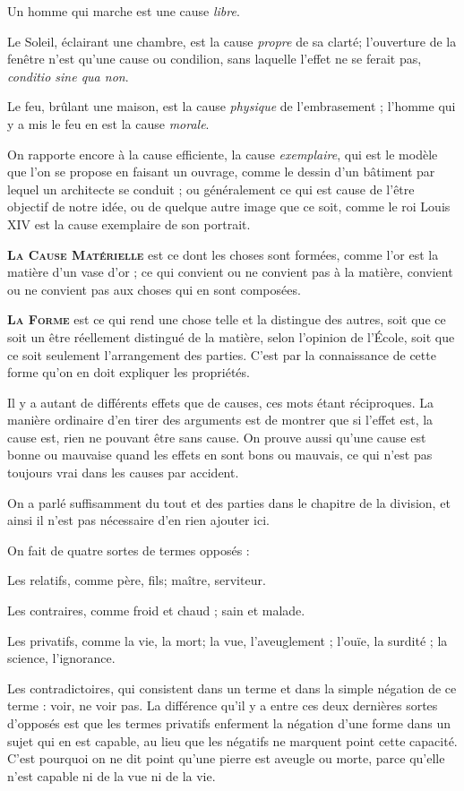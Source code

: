Un homme qui marche est une cause \emph{libre}.

Le Soleil, éclairant une chambre, est la cause \emph{propre} de sa clarté; l'ouverture de la fenêtre n'est qu'une cause ou condilion, sans laquelle l'effet ne se ferait pas, \emph{conditio sine qua non}.

Le feu, brûlant une maison, est la cause \emph{physique} de l'embrasement ; l'homme qui y a mis le feu en est la cause \emph{morale}.

On rapporte encore à la cause efficiente, la cause \emph{exemplaire}, qui est le modèle que l'on se propose en faisant un ouvrage, comme le dessin d'un bâtiment par lequel un architecte se conduit ; ou généralement ce qui est cause de l'être objectif de notre idée, ou de quelque autre image que ce soit, comme le roi Louis XIV est la cause exemplaire de son portrait.

\bigbreak
{\bfseries\scshape La Cause Matérielle} est ce dont les choses sont formées, comme l'or est la matière d'un vase d'or ; ce qui convient ou ne convient pas à la matière, convient ou ne convient pas aux choses qui en sont composées.

\bigbreak
{\bfseries\scshape La Forme} est ce qui rend une chose telle et la distingue des autres, soit que ce soit un être réellement distingué de la matière, selon l'opinion de l'École, soit que ce soit seulement l'arrangement des parties. C'est par la connaissance de cette forme qu'on en doit expliquer les propriétés.

Il y a autant de différents effets que de causes, ces mots étant réciproques. La manière ordinaire d'en tirer des arguments est de montrer que si l'effet est, la cause est, rien ne pouvant être sans cause. On prouve aussi qu'une cause est bonne ou mauvaise quand les effets en sont bons ou mauvais, ce qui n'est pas toujours vrai dans les causes par accident.

On a parlé suffisamment du tout et des parties dans le chapitre de la division, et ainsi il n'est pas nécessaire d'en rien ajouter ici.

On fait de quatre sortes de termes opposés :

Les relatifs, comme père, fils; maître, serviteur.

Les contraires, comme froid et chaud ; sain et malade.

Les privatifs, comme la vie, la mort; la vue, l'aveuglement ; l'ouïe, la surdité ; la science, l'ignorance.

Les contradictoires, qui consistent dans un terme et dans la simple négation de ce terme : voir, ne voir pas. La différence qu'il y a entre ces deux dernières sortes d'opposés est que les termes privatifs enferment la négation d'une forme dans un sujet qui en est capable, au lieu que les négatifs ne marquent point cette capacité. C'est pourquoi on ne dit point qu'une pierre est aveugle ou morte, parce qu'elle n'est capable ni de la vue ni de la vie.

